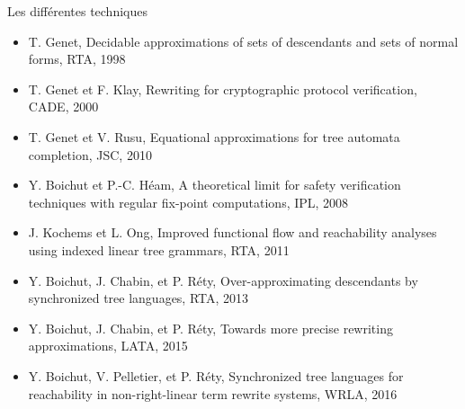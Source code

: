 \begin{frame}{Les différentes techniques}
  \vspace{\baselineskip}
  \begin{overprint}
    \begin{itemize}
    \item {\footnotesize T. Genet, Decidable approximations of sets of descendants and sets of normal forms, RTA, 1998}
    \item {\footnotesize T. Genet et F. Klay, Rewriting for cryptographic protocol verification, CADE, 2000}
    \item {\footnotesize T. Genet et V. Rusu, Equational approximations for tree automata completion, JSC, 2010}
    \end{itemize}
    \begin{itemize}
    \item {\footnotesize Y. Boichut et P.-C. Héam, A theoretical limit for safety verification techniques with regular fix-point computations, IPL, 2008}
    \end{itemize}
    \begin{itemize}
    \item {\footnotesize J. Kochems et L. Ong, Improved functional flow and reachability analyses using indexed linear tree grammars, RTA, 2011}
    \end{itemize}
    \begin{itemize}
    \item {\footnotesize Y. Boichut, J. Chabin, et P. Réty, Over-approximating descendants by synchronized tree languages, RTA, 2013}
    \end{itemize}
    \begin{itemize}
    \item {\footnotesize Y. Boichut, J. Chabin, et P. Réty, Towards more precise rewriting approximations, LATA, 2015}
    \end{itemize}
    \begin{itemize}
    \item {\footnotesize Y. Boichut, V. Pelletier, et P. Réty, Synchronized tree languages for reachability in non-right-linear term rewrite systems, WRLA, 2016}
    \end{itemize}
  \end{overprint}
\end{frame}
